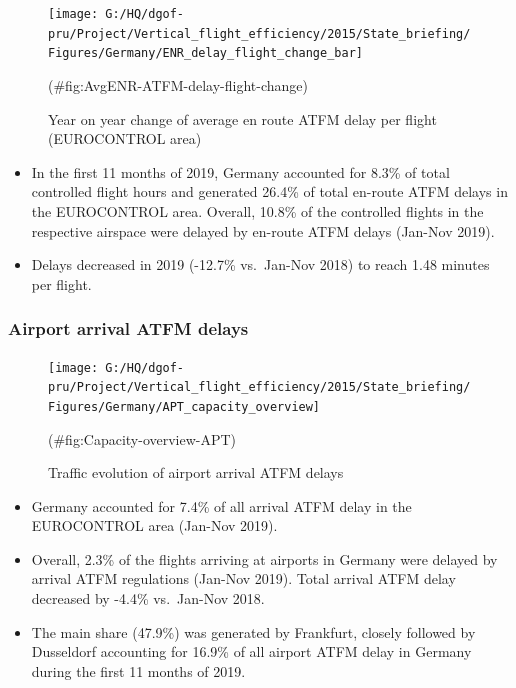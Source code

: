 \documentclass[
]{article}
\providecommand{\tightlist}{%
  \setlength{\itemsep}{0pt}\setlength{\parskip}{0pt}}
\begin{document}
\begin{figure}

{\centering \texttt{[image: G:/HQ/dgof-pru/Project/Vertical\_flight\_efficiency/2015/State\_briefing/Figures/Germany/ENR\_delay\_flight\_change\_bar]} 

}

\caption{Year on year change of average en route ATFM delay per flight (EUROCONTROL area)}(\#fig:AvgENR-ATFM-delay-flight-change)
\end{figure}

\begin{itemize}
\tightlist
\item
  In the first 11 months of 2019, Germany accounted for 8.3\% of total controlled flight hours and generated 26.4\% of total en-route ATFM delays in the EUROCONTROL area. Overall, 10.8\% of the controlled flights in the respective airspace were delayed by en-route ATFM delays (Jan-Nov 2019).
\item
  Delays decreased in 2019 (-12.7\% vs.~Jan-Nov 2018) to reach 1.48 minutes per flight.
\end{itemize}

\hypertarget{airport-arrival-atfm-delays}{%
\subsubsection{Airport arrival ATFM delays}\label{airport-arrival-atfm-delays}}

\begin{figure}

{\centering \texttt{[image: G:/HQ/dgof-pru/Project/Vertical\_flight\_efficiency/2015/State\_briefing/Figures/Germany/APT\_capacity\_overview]} 

}

\caption{Traffic evolution of airport arrival ATFM delays}(\#fig:Capacity-overview-APT)
\end{figure}

\begin{itemize}
\tightlist
\item
  Germany accounted for 7.4\% of all arrival ATFM delay in the EUROCONTROL area (Jan-Nov 2019).
\item
  Overall, 2.3\% of the flights arriving at airports in Germany were delayed by arrival ATFM regulations (Jan-Nov 2019). Total arrival ATFM delay decreased by -4.4\% vs.~Jan-Nov 2018.
\item
  The main share (47.9\%) was generated by Frankfurt, closely followed by Dusseldorf accounting for 16.9\% of all airport ATFM delay in Germany during the first 11 months of 2019.
\end{itemize}
\end{document}

